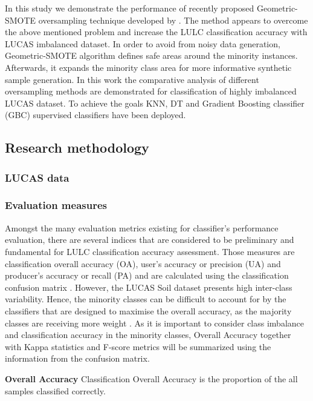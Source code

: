 \documentclass[parskip=full]{scrartcl}
\begin{document}
In this study we demonstrate the performance of recently proposed 
Geometric-SMOTE oversampling technique developed by \cite{Douzas2019}. The 
method appears to overcome the above mentioned problem and increase the LULC 
classification accuracy with LUCAS imbalanced dataset. In order to avoid from 
noisy data generation, Geometric-SMOTE algorithm defines safe areas around the 
minority instances. Afterwards, it expands the minority class area for more 
informative synthetic sample generation. In this work the comparative analysis 
of different oversampling methods are demonstrated for classification of highly 
imbalanced LUCAS dataset. To achieve the goals KNN, DT and Gradient Boosting 
classifier (GBC) supervised classifiers have been deployed.

\subsection{Research methodology}

\subsubsection{LUCAS data}


\subsubsection{Evaluation measures}
Amongst the many evaluation metrics existing for classifier's performance
evaluation, there are several indices that are considered to be preliminary and
fundamental for LULC classification accuracy assessment. Those measures are
classification overall accuracy (OA), user's accuracy or precision (UA) and
producer's accuracy or recall (PA) and are calculated using the classification
confusion matrix \cite{Liu2007}. However, the LUCAS Soil dataset presents high
inter-class variability. Hence, the minority classes can be difficult to
account for by the classifiers that are designed to maximise the overall
accuracy, as the majority classes are receiving more weight \cite{Inglada2017}.
As it is important to consider class imbalance and classification accuracy in
the minority classes, Overall Accuracy together with Kappa statistics and
F-score metrics will be summarized using the information from the confusion
matrix.

\textbf{Overall Accuracy}
Classification Overall Accuracy is the proportion of the all samples classified
correctly.
\end{document}
